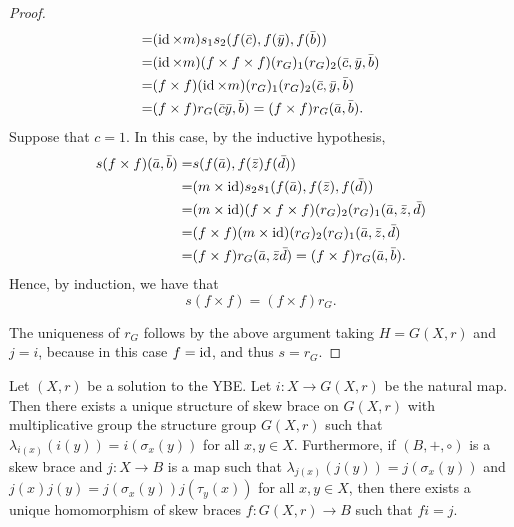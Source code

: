 \begin{proof}
\begin{align*}
    =&(\operatorname{id}\times m)s_1s_2(f(\bar c), f(\bar y), f(\bar b))\\
    =&(\operatorname{id} \times m)(f\times f\times f)(r_G)_1(r_G)_2(\bar c,\bar y,\bar b)\\
    =&(f\times f)(\operatorname{id}\times m)(r_G)_1(r_G)_2(\bar c,\bar y,\bar b)\\
    =&(f\times f)r_G(\bar c\bar y,\bar b)=(f\times f)r_G(\bar a,\bar b).
\end{align*}
Suppose that $c=1$. In this case, by the inductive hypothesis,
\begin{align*}
    s(f\times f)(\bar a,\bar b)=&s(f(\bar a),f(\bar z)f(\bar d))\\
    =&(m\times \operatorname{id})s_2s_1(f(\bar a), f(\bar z), f(\bar d))\\
    =&(m \times \operatorname{id})(f\times f\times f)(r_G)_2(r_G)_1(\bar a,\bar z,\bar d)\\
    =&(f\times f)(m\times \operatorname{id})(r_G)_2(r_G)_1(\bar a,\bar z,\bar d)\\
    =&(f\times f)r_G(\bar a,\bar z\bar d)=(f\times f)r_G(\bar a,\bar b).
\end{align*}
Hence, by induction, we have that
\[s(f\times f)=(f\times f)r_G.\]

The uniqueness of $r_G$ follows by the above argument taking $H=G(X,r)$ and $j=i$, because in this case $f=\operatorname{id}$, and thus $s=r_G$.
\end{proof}

\begin{theorem}\label{thm:GVbraces}
Let $(X,r)$ be a solution to the YBE. Let $i\colon X\rightarrow G(X,r)$ be the natural map. Then there exists a unique structure of skew brace on $G(X,r)$ with multiplicative group the structure group $G(X,r)$ such that $\lambda_{i(x)}(i(y))=i(\sigma_x(y))$ for all $x,y\in X$. Furthermore, if $(B,+,\circ)$ is a skew brace and $j\colon X\rightarrow B$ is a map such that $\lambda_{j(x)}(j(y))=j(\sigma_x(y))$ and $j(x)j(y)=j(\sigma_x(y))j(\tau_y(x))$ for all $x,y\in X$, then there exists a unique homomorphism of skew braces $f\colon G(X,r)\rightarrow B$ such that $fi=j$.  
\end{theorem}

